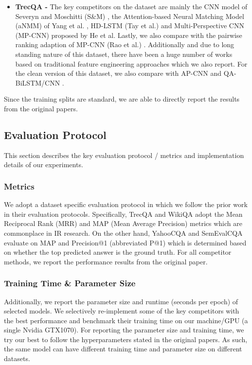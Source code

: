 \documentclass[sigconf]{acmart}
\begin{document}
\begin{itemize}
\item \textbf{TrecQA -} 
The key competitors on the dataset are mainly the CNN model of Severyn and Moschitti (S\&M) \cite{DBLP:conf/sigir/SeverynM15}, the Attention-based Neural Matching Model (aNMM) of Yang et al. \cite{DBLP:conf/cikm/YangAGC16}, HD-LSTM (Tay et al.) \cite{DBLP:conf/sigir/TayPLH17} and Multi-Perspective CNN (MP-CNN) \cite{DBLP:conf/emnlp/HeGL15} proposed by He et al. Lastly, we also compare with the pairwise ranking adaption of MP-CNN (Rao et al.) \cite{DBLP:conf/cikm/RaoHL16}. Additionally and due to long standing nature of this dataset, there have been a huge number of works based on traditional feature engineering approaches \cite{DBLP:conf/emnlp/WangSM07,DBLP:conf/naacl/HeilmanS10a,DBLP:conf/sigir/SeverynMTBR14,DBLP:conf/naacl/YaoDCC13} which we also report. For the clean version of this dataset, we also compare with AP-CNN and QA-BiLSTM/CNN \cite{DBLP:journals/corr/SantosTXZ16}.

\end{itemize}
Since the training splits are standard, we are able to directly report the results from the original papers. 





\subsection{Evaluation Protocol}
This section describes the key evaluation protocol / metrics and implementation details of our experiments. 
\subsubsection{Metrics}
We adopt a dataset specific evaluation protocol in which we follow the prior work in their evaluation protocols. Specifically, TrecQA and WikiQA adopt the Mean Reciprocal Rank (MRR) and MAP (Mean Average Precision) metrics which are commonplace in IR research. On the other hand, YahooCQA and SemEvalCQA evaluate on MAP and Precision@1 (abbreviated P@1) which is determined based on whether the top predicted answer is the ground truth. For all competitor methods, we report the performance results from the original paper. 

\subsubsection{Training Time \& Parameter Size}
Additionally, we report the parameter size and runtime (seconds per epoch) of selected models.  We selectively re-implement some of the key competitors with the best performance and benchmark their training time on our machine/GPU (a single Nvidia GTX1070). For reporting the parameter size and training time, we try our best to follow the hyperparameters stated in the original papers. As such, the same model can have different training time and parameter size on different datasets. 
\end{document}
